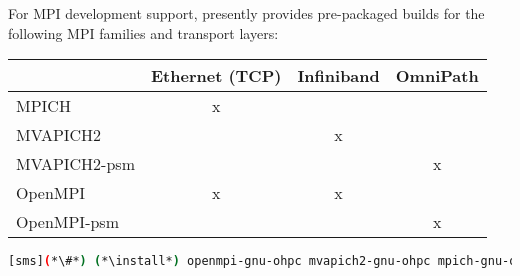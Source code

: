 For MPI development support, \OHPC{} presently provides pre-packaged builds for
the following MPI families and transport layers: 

\begin{table}[h]
\centering
\begin{tabular}{|l|l|l|l|}
\hline
             & Ethernet (TCP)         & Infiniband             & OmniPath               \\ \hline
MPICH        & \multicolumn{1}{c|}{x} &                        &                        \\ \hline
MVAPICH2     &                        & \multicolumn{1}{c|}{x} &                        \\ \hline
MVAPICH2-psm &                        &                        & \multicolumn{1}{c|}{x} \\ \hline
OpenMPI      & \multicolumn{1}{c|}{x} & \multicolumn{1}{c|}{x} &                        \\ \hline
OpenMPI-psm  &                        &                        & \multicolumn{1}{c|}{x} \\ \hline
\end{tabular}
\end{table}

\begin{lstlisting}[language=bash]
[sms](*\#*) (*\install*) openmpi-gnu-ohpc mvapich2-gnu-ohpc mpich-gnu-ohpc
\end{lstlisting}
